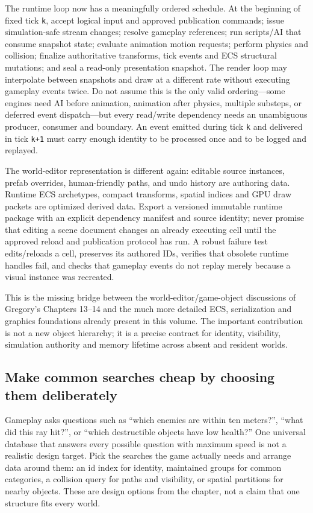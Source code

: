 The runtime loop now has a meaningfully ordered schedule. At the beginning of fixed tick \texttt{k}, accept logical input and approved publication commands; issue simulation-safe stream changes; resolve gameplay references; run scripts/AI that consume snapshot state; evaluate animation motion requests; perform physics and collision; finalize authoritative transforms, tick events and ECS structural mutations; and seal a read-only presentation snapshot. The render loop may interpolate between snapshots and draw at a different rate without executing gameplay events twice. Do not assume this is the only valid ordering---some engines need AI before animation, animation after physics, multiple substeps, or deferred event dispatch---but every read/write dependency needs an unambiguous producer, consumer and boundary. An event emitted during tick \texttt{k} and delivered in tick \texttt{k+1} must carry enough identity to be processed once and to be logged and replayed.

The world-editor representation is different again: editable source instances, prefab overrides, human-friendly paths, and undo history are authoring data. Runtime ECS archetypes, compact transforms, spatial indices and GPU draw packets are optimized derived data. Export a versioned immutable runtime package with an explicit dependency manifest and source identity; never promise that editing a scene document changes an already executing cell until the approved reload and publication protocol has run. A robust failure test edits/reloads a cell, preserves its authored IDs, verifies that obsolete runtime handles fail, and checks that gameplay events do not replay merely because a visual instance was recreated.

This is the missing bridge between the world-editor/game-object discussions of Gregory's Chapters 13--14 and the much more detailed ECS, serialization and graphics foundations already present in this volume. The important contribution is not a new object hierarchy; it is a precise contract for identity, visibility, simulation authority and memory lifetime across absent and resident worlds.

\subsection{Make common searches cheap by choosing them deliberately}\label{06-engine-ii-ch031-make-common-searches-cheap-by-choosing-them-deliberately}

Gameplay asks questions such as ``which enemies are within ten meters?'', ``what did this ray hit?'', or ``which destructible objects have low health?'' One universal database that answers every possible question with maximum speed is not a realistic design target. Pick the searches the game actually needs and arrange data around them: an id index for identity, maintained groups for common categories, a collision query for paths and visibility, or spatial partitions for nearby objects. These are design options from the chapter, not a claim that one structure fits every world.

